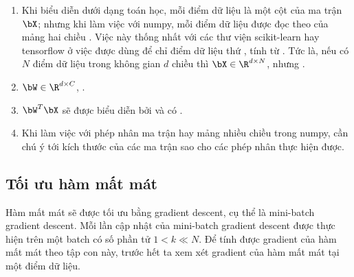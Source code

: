 \begin{mydeff}
\begin{enumerate}
    \item Khi biểu diễn dưới dạng toán học, mỗi điểm dữ liệu là một cột của ma trận
    $\bX$; nhưng khi làm việc với numpy, mỗi điểm dữ liệu được đọc theo
     của mảng hai chiều .
    Việc này
    thống nhất với các thư viện scikit-learn hay tensorflow ở việc
     được dùng để chỉ điểm dữ liệu thứ , tính
    từ . Tức là, nếu có $N$ điểm dữ liệu trong không gian $d$
    chiều thì $\bX \in \R^{d \times N}$, nhưng .

    \item $\bW \in \R^{d\times C}$, . 

    \item $\bW^T\bX$ sẽ được biểu diễn bởi  và có
    . 

    \item Khi làm việc với phép nhân ma trận hay mảng nhiều chiều trong numpy,
    cần chú ý tới kích thước của các ma trận sao cho các phép nhân thực
    hiện được.

\end{enumerate}

\end{mydeff}


\subsection{Tối ưu hàm mất mát }
 

Hàm mất mát sẽ được tối ưu bằng gradient descent, cụ thể là mini-batch
gradient descent. 
Mỗi lần cập nhật của mini-batch gradient descent được thực hiện trên một
{batch} có số phần tử $1 < k \ll N$. Để tính được gradient của hàm mất
mát theo tập con này, trước hết ta xem xét gradient của hàm mất mát tại một điểm
dữ liệu. 

